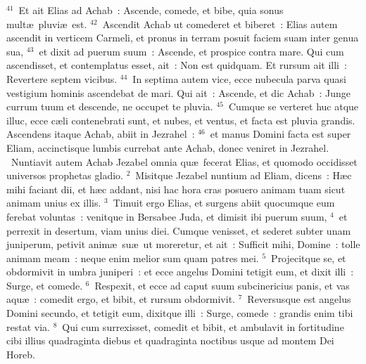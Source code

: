 ${}^{41}$~Et ait Elias ad Achab~: Ascende, comede, et bibe, quia sonus mult\ae\ pluvi\ae\ est.
${}^{42}$~Ascendit Achab ut comederet et biberet~: Elias autem ascendit in verticem Carmeli, et pronus in terram posuit faciem suam inter genua sua,
${}^{43}$~et dixit ad puerum suum~: Ascende, et prospice contra mare. Qui cum ascendisset, et contemplatus esset, ait~: Non est quidquam. Et rursum ait illi~: Revertere septem vicibus.
${}^{44}$~In septima autem vice, ecce nubecula parva quasi vestigium hominis ascendebat de mari. Qui ait~: Ascende, et dic Achab~: Junge currum tuum et descende, ne occupet te pluvia.
${}^{45}$~Cumque se verteret huc atque illuc, ecce c\ae li contenebrati sunt, et nubes, et ventus, et facta est pluvia grandis. Ascendens itaque Achab, abiit in Jezrahel~:
${}^{46}$~et manus Domini facta est super Eliam, accinctisque lumbis currebat ante Achab, donec veniret in Jezrahel.
~\lettrine[lines=10,image=true,loversize=0.05,lraise=-0.03]{N}{}untiavit autem Achab Jezabel omnia qu\ae\ fecerat Elias, et quomodo occidisset universos prophetas gladio.
${}^{2}$~Misitque Jezabel nuntium ad Eliam, dicens~: H\ae c mihi faciant dii, et h\ae c addant, nisi hac hora cras posuero animam tuam sicut animam unius ex illis.
${}^{3}$~Timuit ergo Elias, et surgens abiit quocumque eum ferebat voluntas~: venitque in Bersabee Juda, et dimisit ibi puerum suum,
${}^{4}$~et perrexit in desertum, viam unius diei. Cumque venisset, et sederet subter unam juniperum, petivit anim\ae\ su\ae\ ut moreretur, et ait~: Sufficit mihi, Domine~: tolle animam meam~: neque enim melior sum quam patres mei.
${}^{5}$~Projecitque se, et obdormivit in umbra juniperi~: et ecce angelus Domini tetigit eum, et dixit illi~: Surge, et comede.
${}^{6}$~Respexit, et ecce ad caput suum subcinericius panis, et vas aqu\ae~: comedit ergo, et bibit, et rursum obdormivit.
${}^{7}$~Reversusque est angelus Domini secundo, et tetigit eum, dixitque illi~: Surge, comede~: grandis enim tibi restat via.
${}^{8}$~Qui cum surrexisset, comedit et bibit, et ambulavit in fortitudine cibi illius quadraginta diebus et quadraginta noctibus usque ad montem Dei Horeb.


